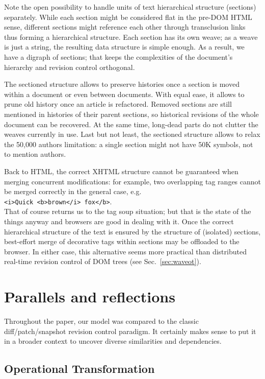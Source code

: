 \documentclass{acm_proc_article-sp}
\begin{document}
Note the open possibility to handle units of text hierarchical
structure (sections) separately. While each section might
be considered flat in the pre-DOM HTML sense, different sections
might reference each other through transclusion links thus
forming a hierarchical structure. Each section has its own weave;
as a weave is just a string, the resulting data structure is
simple enough.
As a result, we have a digraph of sections;  
that keeps the complexities of the document's hierarchy and
revision control orthogonal. 

The sectioned structure allows to preserve histories once a
section is moved within a document or even between documents.
With equal ease, it allows to prune old history once an
article is refactored. Removed sections are still
mentioned in histories of their parent sections, so historical
revisions of the whole document can be recovered. At the
same time, long-dead parts do not clutter the weaves currently
in use. Last but not least, the sectioned structure allows
to relax the 50,000 authors limitation: a single section
might not have 50K symbols, not to mention authors.

Back to HTML, the correct XHTML structure cannot
be guaranteed when merging concurrent modifications: for example,
two overlapping tag ranges cannot be merged correctly in the
general case, e.g. \\ \verb+<i>Quick <b>brown</i> fox</b>+. \\
That of course returns us to the tag soup situation; but that is
the state of the things anyway and  browsers are good in dealing
with it. 
Once the correct hierarchical structure of the text is ensured by
the structure of (isolated) sections, best-effort merge of decorative
tags within sections may be offloaded to the browser.
In either case, this alternative seems more practical
than distributed real-time revision control of DOM trees
(see Sec.~\ref{sec:waveot}).


\section{Parallels and reflections} \label{sec:reflections}

Throughout the paper, our model was compared to the classic
diff/patch/snapshot revision control paradigm. It certainly makes
sense to put it in a broader context to uncover diverse
similarities and dependencies.

\subsection{Operational Transformation} \label{sec:ot}
\end{document}
